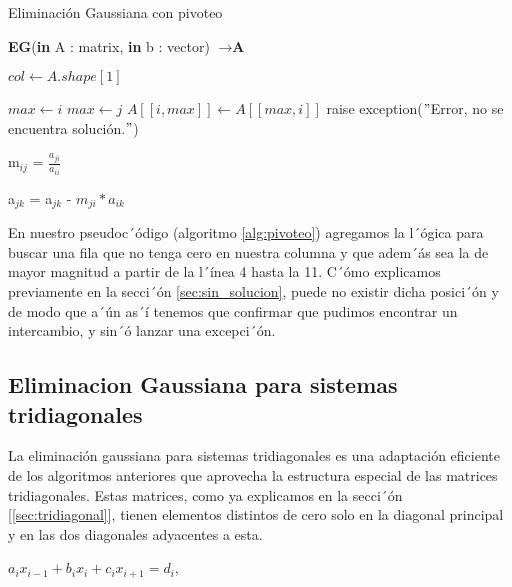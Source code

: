 \begin{algorithm}
\label{alg:pivoteo}
\caption{Eliminación Gaussiana con pivoteo}
\begin{algorithmic}[1]
\State \textbf{EG}(\textbf{in} A : matrix, \textbf{in} b : vector) $\to \textbf{A}$
 
 \State $col \gets A.shape[1]$
 
        \State $max \gets i$
                \State $max \gets j$
            \EndIf
        \EndFor
        \State $A[[i,max]] \gets A[[max,i]]$
    \EndIf
        \State  raise exception($"$Error, no se encuentra solución.$"$) 
    \EndIf
\EndFor
{}

    \State m$_{ij}$ = $\frac{a_{ji}}{a_{ii}}$
    
        \State a$_{jk}$ = a$_{jk}$ - $m_{ji}*{a_{ik}}$
    \EndFor

\EndFor
\end{algorithmic}
\end{algorithm}

En nuestro pseudoc´ódigo (algoritmo \ref{alg:pivoteo}) agregamos la l´ógica para buscar una fila que no tenga cero en nuestra columna y que adem´ás sea la de mayor magnitud a partir de la l´ínea 4 hasta la 11. C´ómo explicamos previamente en la secci´ón \ref{sec:sin_solucion}, puede no existir dicha posici´ón y de modo que a´ún as´í tenemos que confirmar que pudimos encontrar un intercambio, y sin´ó lanzar una excepci´ón.

\subsection{Eliminacion Gaussiana para sistemas tridiagonales}
\label{tridiagonal}
La eliminación gaussiana para sistemas tridiagonales es una adaptación eficiente de los algoritmos anteriores que aprovecha la estructura especial de las matrices tridiagonales. Estas matrices, como ya explicamos en la secci´ón [\ref{sec:tridiagonal}], tienen elementos distintos de cero solo en la diagonal principal y en las dos diagonales adyacentes a esta.
\begin{center}
    $a_{i}x_{i-1}+b_{i}x_{i}+c_{i}x_{i+1} = d_{i}$,
\end{center}
    
    

